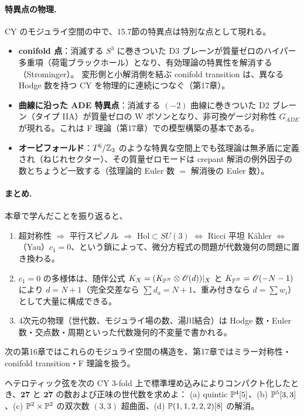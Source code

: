 \paragraph{特異点の物理.}
CY のモジュライ空間の中で、15.7節の特異点は特別な点として現れる。
\begin{itemize}
\item \textbf{conifold 点}：消滅する $S^3$ に巻きついた D3 ブレーンが質量ゼロのハイパー多重項（荷電ブラックホール）となり、有効理論の特異性を解消する（Strominger）。
変形側と小解消側を結ぶ conifold transition は、異なる Hodge 数を持つ CY を物理的に連続につなぐ（第17章）。
\item \textbf{曲線に沿った ADE 特異点}：消滅する $(-2)$ 曲線に巻きついた D2 ブレーン（タイプ IIA）が質量ゼロの W ボソンとなり、非可換ゲージ対称性 $G_{ADE}$ が現れる。これは F 理論（第17章）での模型構築の基本である。
\item \textbf{オービフォールド}：$T^6/\mathbb{Z}_3$ のような特異な空間上でも弦理論は無矛盾に定義され（ねじれセクター）、その質量ゼロモードは crepant 解消の例外因子の数とちょうど一致する（弦理論的 Euler 数 $=$ 解消後の Euler 数）。
\end{itemize}

\paragraph{まとめ.}
本章で学んだことを振り返ると、
\begin{enumerate}
\item 超対称性 $\Rightarrow$ 平行スピノル $\Rightarrow$ $\mathrm{Hol}\subset SU(3)$ $\Leftrightarrow$ Ricci 平坦 K\"ahler $\Leftrightarrow$（Yau）$c_1 = 0$、という鎖によって、微分方程式の問題が代数幾何の問題に置き換わる。
\item $c_1 = 0$ の多様体は、随伴公式 $K_X = (K_{\mathbb{P}^N}\otimes\mathscr{O}(d))|_X$ と $K_{\mathbb{P}^N} = \mathscr{O}(-N-1)$ により $d = N+1$（完全交差なら $\sum d_a = N+1$、重み付きなら $d = \sum w_i$）として大量に構成できる。
\item 4次元の物理（世代数、モジュライ場の数、湯川結合）は Hodge 数・Euler 数・交点数・周期といった代数幾何的不変量で書かれる。
\end{enumerate}
次の第16章ではこれらのモジュライ空間の構造を、第17章ではミラー対称性・conifold transition・F 理論を扱う。

ヘテロティック弦を次の CY 3-fold 上で標準埋め込みによりコンパクト化したとき、$\mathbf{27}$ と $\overline{\mathbf{27}}$ の数および正味の世代数を求めよ：
(a) quintic $\mathbb{P}^4[5]$、(b) $\mathbb{P}^5[3,3]$、(c) $\mathbb{P}^2\times\mathbb{P}^2$ の双次数 $(3,3)$ 超曲面、(d) $\mathbb{P}(1,1,2,2,2)[8]$ の解消。

